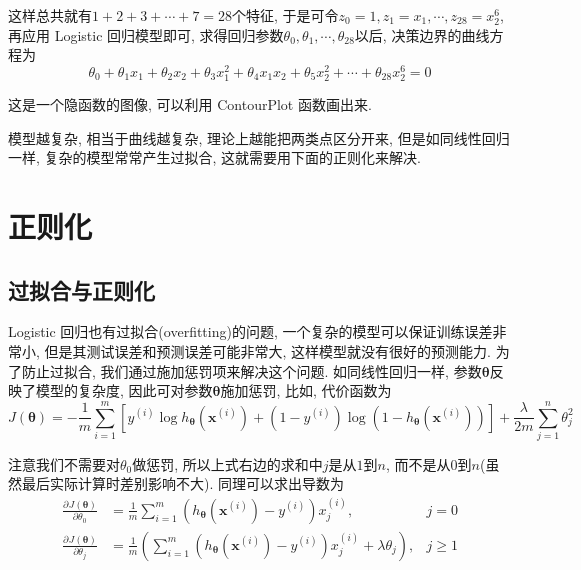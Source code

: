 \documentclass[a4paper,UTF8]{ctexart}
\theoremstyle{plain} \newtheorem{theorem}{定理}[section]
\theoremstyle{plain} \newtheorem{definition}{定义}[section]
\theoremstyle{plain} \newtheorem{lemma}{引理}[section]
\theoremstyle{plain} \newtheorem{proposition}{命题}[section]
\theoremstyle{plain} \newtheorem{example}{例}[section]
\theoremstyle{plain} \newtheorem{remark}{注}[section]
\theoremstyle{plain} \newtheorem{corollary}{推论}[section]
\newcommand{\p}[3]{\frac{\partial^{#1}#2}{\partial{#3}^{#1}}}  %
\begin{document}
这样总共就有$1 + 2 + 3 + \cdots + 7 = 28$个特征, 于是可令$z_{0} = 1, z_{1} = x_{1}, \cdots, z_{28} = x_{2}^{6}$, 再应用 Logistic 回归模型即可, 求得回归参数$\theta_{0}, \theta_{1}, \cdots, \theta_{28}$以后, 决策边界的曲线方程为
\begin{equation*}
\theta_{0} + \theta_{1} x_{1} + \theta_{2} x_{2} + \theta_{3} x_{1}^{2} + \theta_{4} x_{1} x_{2} + \theta_{5} x_{2}^{2} + \cdots + \theta_{28} x_{2}^{6} = 0
\end{equation*}

这是一个隐函数的图像, 可以利用 ContourPlot 函数画出来.


模型越复杂, 相当于曲线越复杂, 理论上越能把两类点区分开来, 但是如同线性回归一样, 复杂的模型常常产生过拟合, 这就需要用下面的正则化来解决.


\section{正则化}

\subsection{过拟合与正则化}
Logistic 回归也有过拟合(overfitting)的问题, 一个复杂的模型可以保证训练误差非常小, 但是其测试误差和预测误差可能非常大, 这样模型就没有很好的预测能力. 为了防止过拟合, 我们通过施加惩罚项来解决这个问题. 如同线性回归一样, 参数$\bm{\theta}$反映了模型的复杂度, 因此可对参数$\bm{\theta}$施加惩罚, 比如, 代价函数为
\begin{equation*}
J(\bm{\theta}) = -\frac{1}{m} \sum_{i=1}^{m} \left[ y^{(i)} \log h_{\bm{\theta}}(\bm{x}^{(i)}) + (1 - y^{(i)}) \log (1 - h_{\bm{\theta}}(\bm{x}^{(i)})) \right] + \frac{\lambda}{2m} \sum_{j=1}^{n} \theta_{j}^{2}
\end{equation*}

注意我们不需要对$\theta_{0}$做惩罚, 所以上式右边的求和中$j$是从$1$到$n$, 而不是从$0$到$n$(虽然最后实际计算时差别影响不大). 同理可以求出导数为
\begin{align*}
\p{}{J(\bm{\theta})}{\theta_{0}} & = \frac{1}{m} \sum_{i=1}^{m} (h_{\bm{\theta}}(\bm{x}^{(i)}) - y^{(i)}) x_{j}^{(i)}  , & j = 0 \\
\p{}{J(\bm{\theta})}{\theta_{j}} & = \frac{1}{m} \left( \sum_{i=1}^{m} (h_{\bm{\theta}}(\bm{x}^{(i)}) - y^{(i)}) x_{j}^{(i)} + \lambda \theta_{j} \right)  , & j \geqslant 1
\end{align*}
\end{document}
